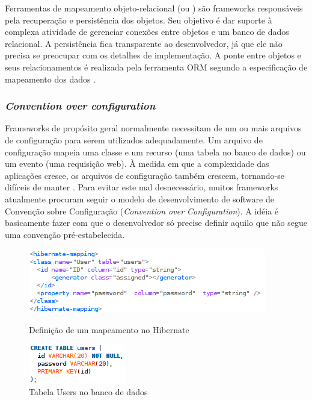 Ferramentas de mapeamento objeto-relacional (ou ) são frameworks 
responsáveis pela recuperação e persistência dos objetos. Seu objetivo é dar suporte à
complexa atividade de gerenciar conexões entre
objetos e um banco de dados relacional. A persistência fica transparente ao desenvolvedor,
já que ele não precisa se preocupar com os detalhes de implementação. A ponte entre
objetos e seus relacionamentos é realizada pela ferramenta ORM segundo a especificação 
de mapeamento dos dados \cite{springerlink}.

\subsubsection{\emph{Convention over configuration}}
Frameworks de propósito geral normalmente necessitam de um ou mais arquivos de configuração
para serem utilizados adequadamente. Um arquivo de configuração mapeia uma classe e um recurso (uma tabela
no banco de dados) ou um evento (uma requisição web). À medida em que a complexidade das
aplicações cresce, os arquivos de configuração também crescem, tornando-se difíceis de manter \cite{Chen}. 
Para evitar este mal desnecessário, muitos frameworks atualmente procuram seguir o modelo
de desenvolvimento de software de Convenção sobre Configuração (\emph{Convention over Configuration}).
A idéia é basicamente fazer com que o desenvolvedor só precise definir aquilo que não segue 
uma convenção pré-estabelecida. 

\begin{figure}[!htbp]
\begin{minipage}[t]{0.5\linewidth}
\includegraphics[scale=0.75]{fig/coc_hibernate.png}
\caption{Definição de um mapeamento no Hibernate}\label{fig:coc_hibernate}
\end{minipage} \hfill
\begin{minipage}[t]{0.3\linewidth}
\includegraphics[scale=0.75]{fig/coc_tabela.png}
\caption{Tabela Users no banco de dados}\label{fig:coc_tabela}
\end{minipage}
\end{figure}


